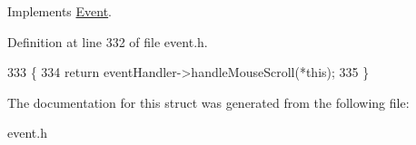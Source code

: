 Implements \hyperlink{classEvent}{Event}.



Definition at line 332 of file event.\+h.


\begin{DoxyCode}
333     \{
334         \textcolor{keywordflow}{return} eventHandler->handleMouseScroll(*\textcolor{keyword}{this});
335     \}
\end{DoxyCode}


The documentation for this struct was generated from the following file\+:\begin{DoxyCompactItemize}
\item 
event.\+h\end{DoxyCompactItemize}
